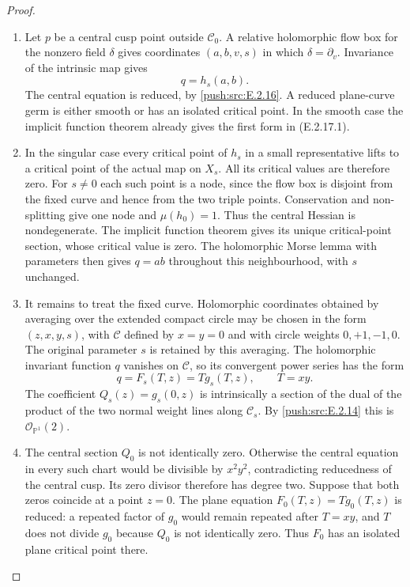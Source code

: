\begin{proof}
\begin{enumerate}[label={$\langle1\rangle$\arabic*.},leftmargin=*]
\item Let $p$ be a central cusp point outside
$\mathcal C_0$.  A relative holomorphic
flow box for the nonzero field $\delta$
gives coordinates $(a,b,v,s)$ in which
$\delta=\partial_v$.  Invariance of the
intrinsic map gives
\[
 q=h_s(a,b).
\]
The central equation is reduced, by
\ref{push:src:E.2.16}.  A reduced plane-curve germ is
either smooth or has an isolated critical
point.  In the smooth case the implicit
function theorem already gives the first
form in (E.2.17.1).

\item In the singular case every critical point
of $h_s$ in a small representative lifts
to a critical point of the actual map
on $X_s$.  All its critical values are
therefore zero.  For $s\ne0$ each such
point is a node, since the flow box is
disjoint from the fixed curve and hence
from the two triple points.  Conservation
and non-splitting give one node and
$\mu(h_0)=1$.  Thus the central Hessian
is nondegenerate.  The implicit function
theorem gives its unique critical-point
section, whose critical value is zero.
The holomorphic Morse lemma with
parameters then gives $q=ab$ throughout
this neighbourhood, with $s$ unchanged.

\item It remains to treat the fixed curve.
Holomorphic coordinates obtained by
averaging over the extended compact
circle may be chosen in the form
$(z,x,y,s)$, with $\mathcal C$ defined
by $x=y=0$ and with circle weights
$0,+1,-1,0$.  The original parameter
$s$ is retained by this averaging.
The holomorphic invariant function $q$
vanishes on $\mathcal C$, so its
convergent power series has the form
\[
 q=F_s(T,z)=T g_s(T,z),\qquad T=xy.
 \tag{E.2.17.2}
\]
The coefficient
$Q_s(z)=g_s(0,z)$ is intrinsically a
section of the dual of the product of
the two normal weight lines along
$\mathcal C_s$.  By \ref{push:src:E.2.14} this is
$\mathcal O_{\mathbb P^1}(2)$.

\item The central section $Q_0$ is not
identically zero.  Otherwise the
central equation in every such chart
would be divisible by $x^2y^2$,
contradicting reducedness of the
central cusp.  Its zero divisor
therefore has degree two.  Suppose
that both zeros coincide at a point
$z=0$.  The plane equation
$F_0(T,z)=Tg_0(T,z)$ is reduced:
a repeated factor of $g_0$ would
remain repeated after $T=xy$, and
$T$ does not divide $g_0$ because
$Q_0$ is not identically zero.
Thus $F_0$ has an isolated plane
critical point there.


\end{enumerate}
\end{proof}
